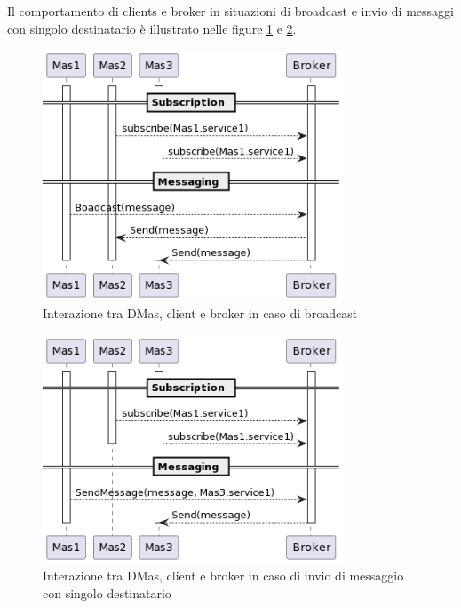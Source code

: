Il comportamento di clients e broker in situazioni di broadcast e invio di messaggi con singolo destinatario è illustrato nelle figure \ref{fig:interaction-broadcast} e \ref{fig:interaction-sendmessage}.

\begin{figure}[ht!]
    \centering
    \includegraphics[width=0.8\textwidth]{figures/interaction-broadcast.png}
    \caption{Interazione tra DMas, client e broker in caso di broadcast}
    \label{fig:interaction-broadcast}
\end{figure}

\begin{figure}[ht!]
    \centering
    \includegraphics[width=0.8\textwidth]{figures/interaction-sendmessage.png}
    \caption{Interazione tra DMas, client e broker in caso di invio di messaggio con singolo destinatario}
    \label{fig:interaction-sendmessage}
\end{figure}
